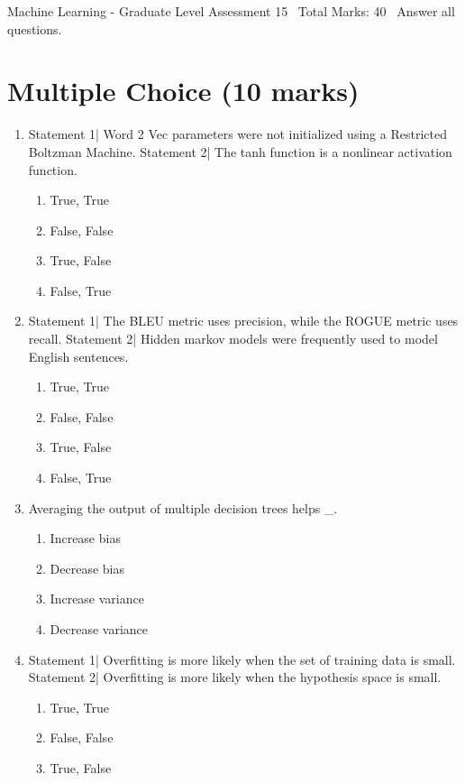 \documentclass[12pt]{article}
\begin{document}
\begin{center}
Machine Learning - Graduate Level Assessment 15 \
Total Marks: 40 \
Answer all questions.
\end{center}

\section*{Multiple Choice (10 marks)}
\begin{enumerate}[label=\arabic*.]
\item Statement 1| Word 2 Vec parameters were not initialized using a Restricted Boltzman Machine. Statement 2| The tanh function is a nonlinear activation function.
\begin{enumerate}[label=(\alph*)]
    \item True, True
    \item False, False
    \item True, False
    \item False, True
\end{enumerate}
\item Statement 1| The BLEU metric uses precision, while the ROGUE metric uses recall. Statement 2| Hidden markov models were frequently used to model English sentences.
\begin{enumerate}[label=(\alph*)]
    \item True, True
    \item False, False
    \item True, False
    \item False, True
\end{enumerate}
\item Averaging the output of multiple decision trees helps \_.
\begin{enumerate}[label=(\alph*)]
    \item Increase bias
    \item Decrease bias
    \item Increase variance
    \item Decrease variance
\end{enumerate}
\item Statement 1| Overfitting is more likely when the set of training data is small. Statement 2| Overfitting is more likely when the hypothesis space is small.
\begin{enumerate}[label=(\alph*)]
    \item True, True
    \item False, False
    \item True, False

\end{enumerate}
\end{enumerate}
\end{document}
